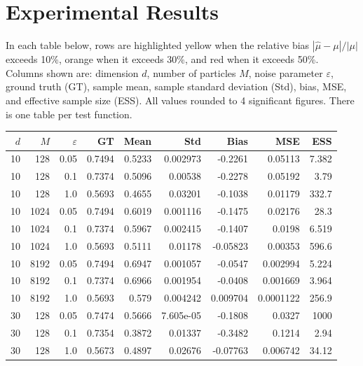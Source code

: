 \documentclass{article}
\begin{document}
\appendix
\section{Experimental Results}
\label{sec:experiments}

In each table below, rows are highlighted \colorbox{yellow!40}{yellow} when the
relative bias $|\hat\mu - \mu|/|\mu|$ exceeds 10\%, \colorbox{orange!50}{orange}
when it exceeds 30\%, and \colorbox{red!40}{red} when it exceeds 50\%. Columns
shown are: dimension $d$, number of particles $M$, noise parameter
$\varepsilon$, ground truth (GT), sample mean, sample standard deviation (Std),
bias, MSE, and effective sample size (ESS). All values rounded to 4 significant
figures. There is one table per test function.

\begin{table}[htbp]
\centering
\scriptsize
\setlength{\tabcolsep}{4pt}
\begin{tabular}{rrr|rrrrrr}
\toprule
$d$ & $M$ & $\varepsilon$ & GT & Mean & Std & Bias & MSE & ESS \\
\midrule
\rowcolor{orange!50}10 & 128 & 0.05 & 0.7494 & 0.5233 & 0.002973 & -0.2261 & 0.05113 & 7.382 \\
\rowcolor{orange!50}10 & 128 & 0.1 & 0.7374 & 0.5096 & 0.00538 & -0.2278 & 0.05192 & 3.79 \\
\rowcolor{yellow!40}10 & 128 & 1.0 & 0.5693 & 0.4655 & 0.03201 & -0.1038 & 0.01179 & 332.7 \\
\midrule
\rowcolor{yellow!40}10 & 1024 & 0.05 & 0.7494 & 0.6019 & 0.001116 & -0.1475 & 0.02176 & 28.3 \\
\rowcolor{yellow!40}10 & 1024 & 0.1 & 0.7374 & 0.5967 & 0.002415 & -0.1407 & 0.0198 & 6.519 \\
\rowcolor{yellow!40}10 & 1024 & 1.0 & 0.5693 & 0.5111 & 0.01178 & -0.05823 & 0.00353 & 596.6 \\
\midrule
10 & 8192 & 0.05 & 0.7494 & 0.6947 & 0.001057 & -0.0547 & 0.002994 & 5.224 \\
10 & 8192 & 0.1 & 0.7374 & 0.6966 & 0.001954 & -0.0408 & 0.001669 & 3.964 \\
10 & 8192 & 1.0 & 0.5693 & 0.579 & 0.004242 & 0.009704 & 0.0001122 & 256.9 \\
\midrule
\rowcolor{yellow!40}30 & 128 & 0.05 & 0.7474 & 0.5666 & 7.605e-05 & -0.1808 & 0.0327 & 1000 \\
\rowcolor{orange!50}30 & 128 & 0.1 & 0.7354 & 0.3872 & 0.01337 & -0.3482 & 0.1214 & 2.94 \\
\rowcolor{yellow!40}30 & 128 & 1.0 & 0.5673 & 0.4897 & 0.02676 & -0.07763 & 0.006742 & 34.12 \\

\end{tabular}
\end{table}
\end{document}
